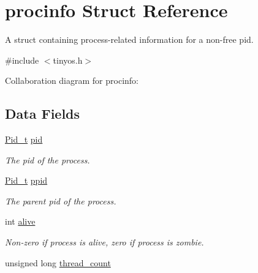 \hypertarget{structprocinfo}{}\section{procinfo Struct Reference}
\label{structprocinfo}


A struct containing process-\/related information for a non-\/free pid.  




{\ttfamily \#include $<$tinyos.\+h$>$}



Collaboration diagram for procinfo\+:
\subsection*{Data Fields}
\begin{DoxyCompactItemize}
\item 
\mbox{\label{structprocinfo_a2e87cd5f0bdfe214832ec20f53deeb50}} 
\hyperlink{group__syscalls_gafac07f3170763932fac97b6eab2c3984}{Pid\+\_\+t} \hyperlink{structprocinfo_a2e87cd5f0bdfe214832ec20f53deeb50}{pid}
\begin{DoxyCompactList}\small\item\em The pid of the process. \end{DoxyCompactList}\item 
\hyperlink{group__syscalls_gafac07f3170763932fac97b6eab2c3984}{Pid\+\_\+t} \hyperlink{structprocinfo_a790970c70987013b2712b7dd6d2b75b9}{ppid}
\begin{DoxyCompactList}\small\item\em The parent pid of the process. \end{DoxyCompactList}\item 
\mbox{\label{structprocinfo_a999dc5dbfee9902a9ea458944499efd3}} 
int \hyperlink{structprocinfo_a999dc5dbfee9902a9ea458944499efd3}{alive}
\begin{DoxyCompactList}\small\item\em Non-\/zero if process is alive, zero if process is zombie. \end{DoxyCompactList}\item 
unsigned long \hyperlink{structprocinfo_ae1ed3afa8904729a1daf1b51780cf2cf}{thread\+\_\+count}
\item 
\mbox{\label{structprocinfo_a4da339065f8780b37ab788f18ef9ed20}} 

\end{DoxyCompactItemize}
